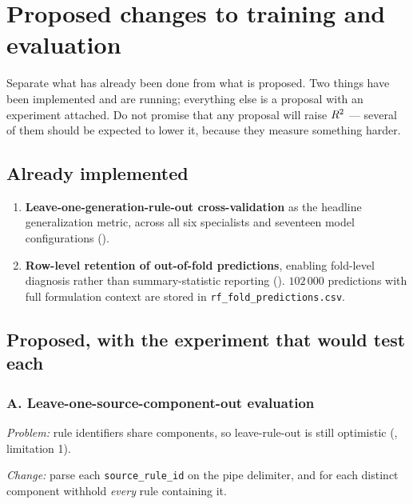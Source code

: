 \chapter{Proposed changes to training and evaluation}
\label{ch:proposals}

\begin{saybox}[title=What to say at the start of this section]
Separate what has already been done from what is proposed. Two things have
been implemented and are running; everything else is a proposal with an
experiment attached. Do not promise that any proposal will raise $R^2$ ---
several of them should be expected to lower it, because they measure
something harder.
\end{saybox}

\section{Already implemented}

\begin{enumerate}[leftmargin=1.5em, itemsep=2pt]
\item \textbf{Leave-one-generation-rule-out cross-validation} as the
  headline generalization metric, across all six specialists and seventeen
  model configurations ().
\item \textbf{Row-level retention of out-of-fold predictions}, enabling
  fold-level diagnosis rather than summary-statistic reporting
  (). $102\,000$ predictions with full formulation context
  are stored in \texttt{rf\_fold\_predictions.csv}.
\end{enumerate}

\section{Proposed, with the experiment that would test each}

\subsection{A. Leave-one-source-component-out evaluation}

\emph{Problem:} rule identifiers share components, so leave-rule-out is
still optimistic (, limitation 1).

\emph{Change:} parse each \texttt{source\_rule\_id} on the pipe delimiter,
and for each distinct component withhold \emph{every} rule containing it.


